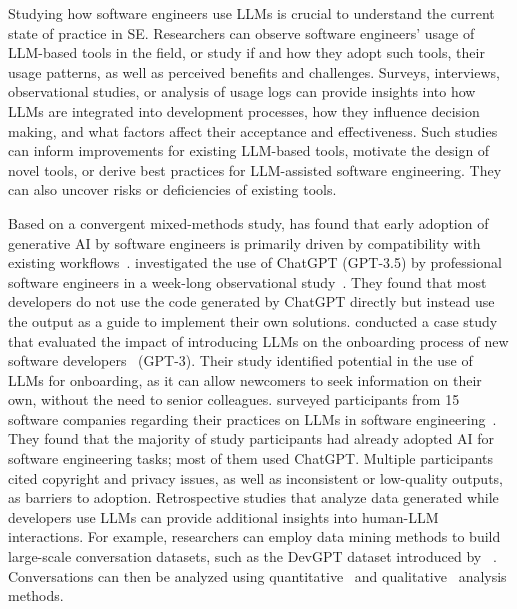 \label{sec:studying-llm-usage-in-software-engineering}


Studying how software engineers use LLMs is crucial to understand the current state of practice in SE.
Researchers can observe software engineers' usage of LLM-based tools in the field, or study if and how they adopt such tools, their usage patterns, as well as perceived benefits and challenges.
Surveys, interviews, observational studies, or analysis of usage logs can provide insights into how LLMs are integrated into development processes, how they influence decision making, and what factors affect their acceptance and effectiveness. 
Such studies can inform improvements for existing LLM-based tools, motivate the design of novel tools, or derive best practices for LLM-assisted software engineering.
They can also uncover risks or deficiencies of existing tools.


Based on a convergent mixed-methods study, \citeauthor{russo2024navigating} has found that early adoption of generative AI by software engineers is primarily driven by compatibility with existing workflows~\cite{russo2024navigating}.
\citeauthor{DBLP:journals/pacmse/KhojahM0N24} investigated the use of ChatGPT (GPT-3.5) by professional software engineers in a week-long observational study~\cite{DBLP:journals/pacmse/KhojahM0N24}.
They found that most developers do not use the code generated by ChatGPT directly but instead use the output as a guide to implement their own solutions.
\citeauthor{DBLP:conf/csee/AzanzaPIG24} conducted a case study that evaluated the impact of introducing LLMs on the onboarding process of new software developers~\cite{DBLP:conf/csee/AzanzaPIG24} (GPT-3).
Their study identified potential in the use of LLMs for onboarding, as it can allow newcomers to seek information on their own, without the need to  senior colleagues.
 \citeauthor{DBLP:conf/icsa/JahicS24} surveyed participants from 15 software companies regarding their practices on LLMs in software engineering~\cite{DBLP:conf/icsa/JahicS24}.
They found that the majority of study participants had already adopted AI for software engineering tasks; most of them used ChatGPT.
Multiple participants cited copyright and privacy issues, as well as inconsistent or low-quality outputs, as barriers to adoption.
Retrospective studies that analyze data generated while developers use LLMs can provide additional insights into human-LLM interactions.
For example, researchers can employ data mining methods to build large-scale conversation datasets, such as the DevGPT dataset introduced by \citeauthor{DBLP:conf/msr/XiaoTHM24}~\cite{DBLP:conf/msr/XiaoTHM24}.
Conversations can then be analyzed using quantitative~\cite{DBLP:conf/msr/RabbiCZI24} and qualitative~\cite{DBLP:conf/msr/MohamedPP24} analysis methods.

